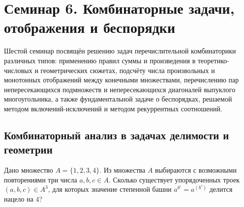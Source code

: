 \section{Семинар 6. Комбинаторные задачи, отображения и беспорядки}

\begin{remark}
    Шестой семинар посвящён решению задач перечислительной комбинаторики 
    различных типов: применению правил суммы и произведения в теоретико-числовых 
    и геометрических сюжетах, подсчёту числа произвольных и монотонных 
    отображений между конечными множествами, перечислению пар 
    непересекающихся подмножеств и непересекающихся диагоналей выпуклого 
    многоугольника, а также фундаментальной задаче о беспорядках, решаемой 
    методом включений-исключений и методом рекуррентных соотношений.
\end{remark}

\subsection{Комбинаторный анализ в задачах делимости и геометрии}

\begin{problem}
    Дано множество $A = \{1, 2, 3, 4\}$. Из множества $A$ выбираются с 
    возможными повторениями три числа $a, b, c \in A$. Сколько существует 
    упорядоченных троек $(a, b, c) \in A^3$, для которых значение 
    степенной башни $a^{b^c} = a^{(b^c)}$ делится нацело на $4$?
\end{problem}

